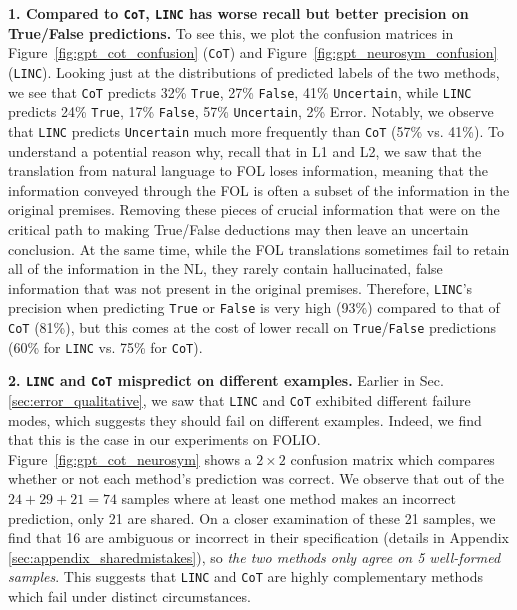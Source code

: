\documentclass[11pt]{article}
\begin{document}
\textbf{1. Compared to \texttt{CoT}, \texttt{LINC} has worse recall but better precision on True/False predictions.} To see this,
we plot the confusion matrices in Figure~\ref{fig:gpt_cot_confusion} (\texttt{CoT}) and Figure~\ref{fig:gpt_neurosym_confusion} (\texttt{LINC}). 
Looking just at the distributions of predicted labels of the two methods, we see that \texttt{CoT} predicts 32\% \texttt{True}, 27\% \texttt{False}, 41\% \texttt{Uncertain}, while \texttt{LINC} predicts 24\% \texttt{True}, 17\% \texttt{False}, 57\% \texttt{Uncertain}, 2\% Error.
Notably, we observe that \texttt{LINC} predicts \texttt{Uncertain} much more frequently than \texttt{CoT} (57\% vs. 41\%).
To understand a potential reason why, recall that in L1 and L2, we saw that the translation from natural language to FOL loses information, meaning that the information conveyed through the FOL is often a subset of the information in the original premises. Removing these pieces of crucial information that were on the critical path to making True/False deductions may then leave an uncertain conclusion. 
At the same time, while the FOL translations sometimes fail to retain all of the information in the NL, they rarely contain hallucinated, false information that was not present in the original premises.
Therefore, \texttt{LINC}'s precision when predicting \texttt{True} or \texttt{False} is very high (93\%) compared to that of \texttt{CoT} (81\%), but this comes at the cost of lower recall on \texttt{True}/\texttt{False} predictions (60\% for \texttt{LINC} vs. 75\% for \texttt{CoT}).

\textbf{2. \texttt{LINC} and \texttt{CoT} mispredict on different examples.} Earlier in Sec. \ref{sec:error_qualitative}, we saw that \texttt{LINC} and \texttt{CoT} exhibited different failure modes, which suggests they should fail on different examples.
Indeed, we find that this is the case in our experiments on FOLIO.
Figure~\ref{fig:gpt_cot_neurosym} shows a $2\times2$ confusion matrix which compares whether or not each method's prediction was correct.
We observe that out of the $24+29+21=74$ samples where at least one method makes an incorrect prediction, only 21 are shared.
On a closer examination of these 21 samples, we find that 16 are ambiguous or incorrect in their specification (details in Appendix \ref{sec:appendix_sharedmistakes}), so \textit{the two methods only agree on 5 well-formed samples}.
This suggests that \texttt{LINC} and \texttt{CoT} are highly complementary methods which fail under distinct circumstances.
\end{document}
